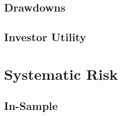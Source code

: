 \documentclass[11pt]{article}
\begin{document}


\subsection{Drawdowns}

 \label{sec:drawdowns}

\subsection{Investor Utility} \label{sec:invest_util}



\section{Systematic Risk}\label{sec:regression}

\subsection{In-Sample} \label{sec:in_sample}







%
%
%
%
%
%
%
\end{document}
